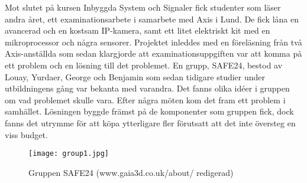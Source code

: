 



\begin{abstracts}        %
Mot slutet på kursen Inbyggda System och Signaler fick studenter som läser andra året, ett examinationsarbete i samarbete med Axis i Lund. De fick låna en avancerad och en kostsam IP-kamera, samt ett litet elektriskt kit med en mikroprocessor och några sensorer. Projektet inleddes med en föreläsning från två Axis-anställda som sedan klargjorde att examinationsuppgiften var att komma på ett problem och en lösning till det problemet. En grupp, SAFE24, bestod av Louay, Yurdaer, George och Benjamin som sedan tidigare studier under utbildningens gång var bekanta med varandra. Det fanns olika idéer i gruppen om vad problemet skulle vara. Efter några möten kom det fram ett problem i samhället. Lösningen byggde främst på de komponenter som gruppen fick, dock fanns det utrymme för att köpa ytterligare fler förutsatt att det inte översteg en viss budget.



\begin{figure}[h]
  \texttt{[image: group1.jpg]}
  \caption{Gruppen SAFE24 (www.gaia3d.co.uk/about/ redigerad)}
  \label{fig:group1}
\end{figure}


\end{abstracts}


